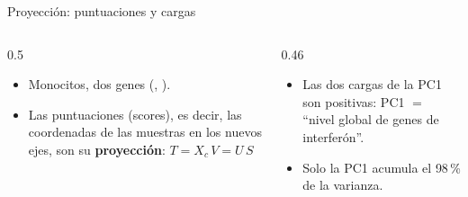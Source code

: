 \begin{frame}{Proyección: puntuaciones y cargas}
  \centering
  \vspace{0.05cm}
  \begin{columns}[T]
    \begin{column}{0.5\linewidth}\small
      \begin{itemize}\setlength\itemsep{2pt}
        \item Monocitos, dos genes (, ).
        \item Las \alert{puntuaciones} (scores), es decir, las coordenadas de las muestras en los nuevos ejes, son su \textbf{proyección}: $T=X_c\,V=U\,S$
      \end{itemize}
    \end{column}
    \begin{column}{0.46\linewidth}\small
      \begin{itemize}\setlength\itemsep{2pt}
        \item Las dos cargas de la PC1 son positivas: PC1 $=$ ``nivel global de genes de interferón''.
        \item Solo la PC1 acumula el \alert{98\,\%} de la varianza.
      \end{itemize}
    \end{column}
  \end{columns}
\end{frame}

